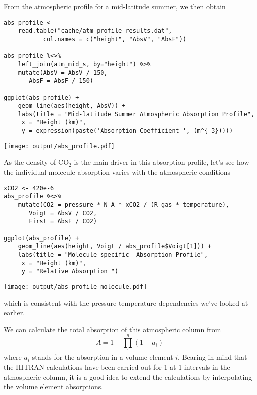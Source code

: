 \documentclass[10pt,a4paper,titlepage]{article}
\begin{document}
From the atmospheric profile for a mid-latitude summer, we then obtain

\begin{lstlisting}
abs_profile <-
    read.table("cache/atm_profile_results.dat",
	       col.names = c("height", "AbsV", "AbsF"))

abs_profile %<>%
    left_join(atm_mid_s, by="height") %>%
    mutate(AbsV = AbsV / 150,
	   AbsF = AbsF / 150)

ggplot(abs_profile) +
    geom_line(aes(height, AbsV)) +
    labs(title = "Mid-latitude Summer Atmospheric Absorption Profile",
	 x = "Height (km)",
	 y = expression(paste('Absorption Coefficient ', (m^{-3}))))
\end{lstlisting}

\texttt{[image: output/abs\_profile.pdf]}

As the density of CO$_{\text{2}}$ is the main driver in this absorption
profile, let's see how the individual molecule absorption varies with
the atmospheric conditions

\begin{lstlisting}
xCO2 <- 420e-6
abs_profile %<>%
    mutate(CO2 = pressure * N_A * xCO2 / (R_gas * temperature),
	   Voigt = AbsV / CO2,
	   First = AbsF / CO2)

ggplot(abs_profile) +
    geom_line(aes(height, Voigt / abs_profile$Voigt[1])) +
    labs(title = "Molecule-specific  Absorption Profile",
	 x = "Height (km)",
	 y = "Relative Absorption ")
\end{lstlisting}

\texttt{[image: output/abs\_profile\_molecule.pdf]}

which is consistent with the pressure-temperature dependencies we've
looked at earlier.

We can calculate the total absorption of this atmospheric column from
\begin{equation}
A = 1 - \prod_1^n (1 - a_i)
\end{equation}
where $a_i$ stands for the absorption in a volume element $i$. Bearing
in mind that the HITRAN calculations have been carried out for
\unit{1}{\cubic\metre} at \unit{1}{\kilo\metre} intervals in the
atmospheric column, it is a good idea to extend the calculations by
interpolating the volume element absorptions.
\end{document}
